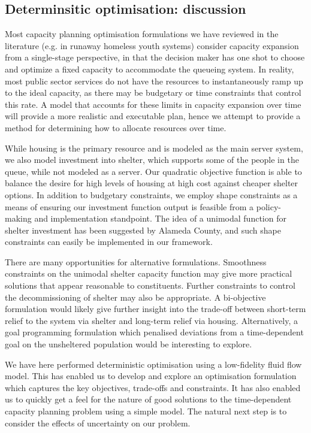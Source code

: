 \documentclass[12pt,a4paper]{article}
\begin{document}
\subsection{Determinsitic optimisation: discussion} \label{do-discuss}

Most capacity planning optimisation formulations we have reviewed in the literature (e.g. in runaway homeless youth systems) consider capacity expansion from a single-stage perspective, in that the decision maker has one shot to choose and optimize a fixed capacity to accommodate the queueing system.   In reality, most public sector services do not have the resources to instantaneously ramp up to the ideal capacity, as there may be budgetary or time constraints that control this rate.  A model that accounts for these limits in capacity expansion over time will provide a more realistic and executable plan, hence we attempt to provide a method for determining how to allocate resources over time.

While housing is the primary resource and is modeled as the main server system, we also model investment into shelter, which supports some of the people in the queue, while not modeled as a server. Our quadratic objective function is able to balance the desire for high levels of housing at high cost against cheaper shelter options. In addition to budgetary constraints, we employ shape constraints as a means of ensuring our investment function output is feasible from a policy-making and implementation standpoint.  The idea of a unimodal function for shelter investment has been suggested by Alameda County, and such shape constraints can easily be implemented in our framework.

There are many opportunities for alternative formulations.  Smoothness constraints on the unimodal shelter capacity function may give more practical solutions that appear reasonable to constituents. Further constraints to control the decommissioning of shelter may also be appropriate. A bi-objective formulation would likely give further insight into the trade-off between short-term relief to the system via shelter and long-term relief via housing. Alternatively, a goal programming formulation which penalised deviations from a time-dependent goal on the unsheltered population would be interesting to explore.

We have here performed deterministic optimisation using a low-fidelity fluid flow model. This has enabled us to develop and explore an optimisation formulation which captures the key objectives, trade-offs and constraints. It has also enabled us to quickly get a feel for the nature of good solutions to the time-dependent capacity planning problem using a simple model. The natural next step is to consider the effects of uncertainty on our problem.
\end{document}
